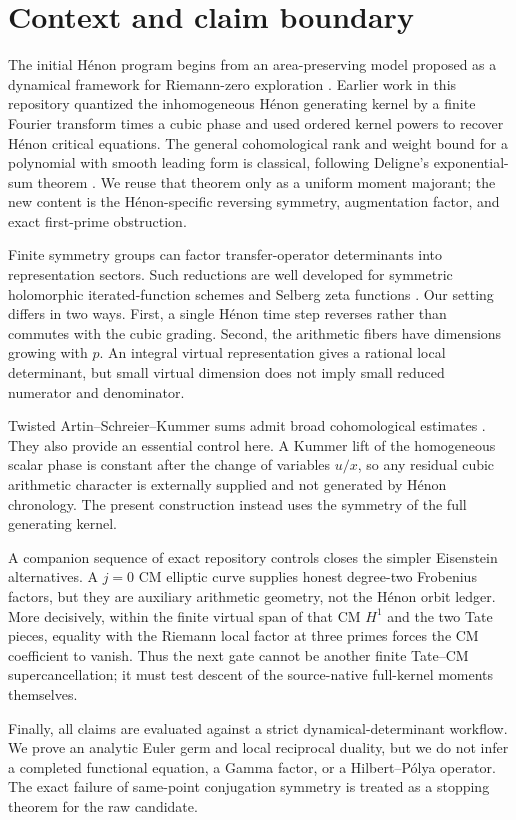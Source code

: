 \section{Context and claim boundary}

The initial H\'enon program begins from an area-preserving model proposed as
a dynamical framework for Riemann-zero exploration \cite{Wang2026HenonModel}.
Earlier work in this repository quantized the inhomogeneous H\'enon
generating kernel by a finite Fourier transform times a cubic phase and used
ordered kernel powers to recover H\'enon critical equations.  The general
cohomological rank and weight bound for a polynomial with smooth leading
form is classical, following Deligne's exponential-sum theorem
\cite{Deligne1974Weil}.  We reuse that theorem only as a uniform moment
majorant; the new content is the H\'enon-specific reversing symmetry,
augmentation factor, and exact first-prime obstruction.

Finite symmetry groups can factor transfer-operator determinants into
representation sectors.  Such reductions are well developed for symmetric
holomorphic iterated-function schemes and Selberg zeta functions
\cite{BorthwickWeich2016}.  Our setting differs in two ways.  First, a single
H\'enon time step reverses rather than commutes with the cubic grading.
Second, the arithmetic fibers have dimensions growing with $p$.  An integral
virtual representation gives a rational local determinant, but small virtual
dimension does not imply small reduced numerator and denominator.

Twisted Artin--Schreier--Kummer sums admit broad cohomological estimates
\cite{Fu2009Twisted}.  They also provide an essential control here.  A
Kummer lift of the homogeneous scalar phase is constant after the change of
variables $u/x$, so any residual cubic arithmetic character is externally
supplied and not generated by H\'enon chronology.  The present construction
instead uses the symmetry of the full generating kernel.

A companion sequence of exact repository controls closes the simpler
Eisenstein alternatives.  A $j=0$ CM elliptic curve supplies honest
degree-two Frobenius factors, but they are auxiliary arithmetic geometry, not
the H\'enon orbit ledger.  More decisively, within the finite virtual span of
that CM $H^1$ and the two Tate pieces, equality with the Riemann local factor
at three primes forces the CM coefficient to vanish.  Thus the next gate
cannot be another finite Tate--CM supercancellation; it must test descent of
the source-native full-kernel moments themselves.

Finally, all claims are evaluated against a strict dynamical-determinant
workflow.  We prove an analytic Euler germ and local reciprocal duality, but
we do not infer a completed functional equation, a Gamma factor, or a
Hilbert--P\'olya operator.  The exact failure of same-point conjugation
symmetry is treated as a stopping theorem for the raw candidate.
